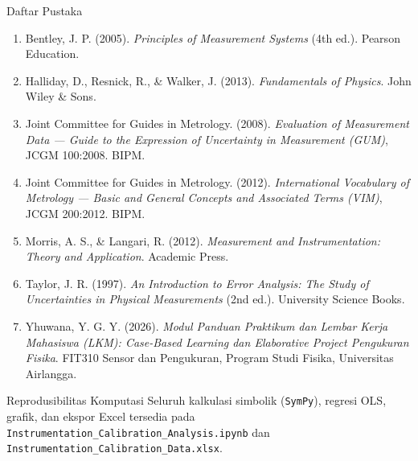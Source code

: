 \documentclass[aspectratio=169,10pt]{beamer}
\newcommand{\xs}{\fontsize{7.1}{9}\selectfont}
\begin{document}
\begin{frame}{Daftar Pustaka}
\xs
\begin{enumerate}
\item Bentley, J. P. (2005). \emph{Principles of Measurement Systems} (4th ed.). Pearson Education.
\item Halliday, D., Resnick, R., \& Walker, J. (2013). \emph{Fundamentals of Physics}. John Wiley \& Sons.
\item Joint Committee for Guides in Metrology. (2008). \emph{Evaluation of Measurement Data --- Guide to the Expression of Uncertainty in Measurement (GUM)}, JCGM 100:2008. BIPM.
\item Joint Committee for Guides in Metrology. (2012). \emph{International Vocabulary of Metrology --- Basic and General Concepts and Associated Terms (VIM)}, JCGM 200:2012. BIPM.
\item Morris, A. S., \& Langari, R. (2012). \emph{Measurement and Instrumentation: Theory and Application}. Academic Press.
\item Taylor, J. R. (1997). \emph{An Introduction to Error Analysis: The Study of Uncertainties in Physical Measurements} (2nd ed.). University Science Books.
\item Yhuwana, Y. G. Y. (2026). \emph{Modul Panduan Praktikum dan Lembar Kerja Mahasiswa (LKM): Case-Based Learning dan Elaborative Project Pengukuran Fisika}. FIT310 Sensor dan Pengukuran, Program Studi Fisika, Universitas Airlangga.
\end{enumerate}
\vspace{2mm}
\begin{exampleblock}{Reprodusibilitas Komputasi}\xs
Seluruh kalkulasi simbolik (\texttt{SymPy}), regresi OLS, grafik, dan ekspor Excel tersedia pada \texttt{Instrumentation\_Calibration\_Analysis.ipynb} dan \texttt{Instrumentation\_Calibration\_Data.xlsx}.
\end{exampleblock}
\end{frame}
\end{document}
